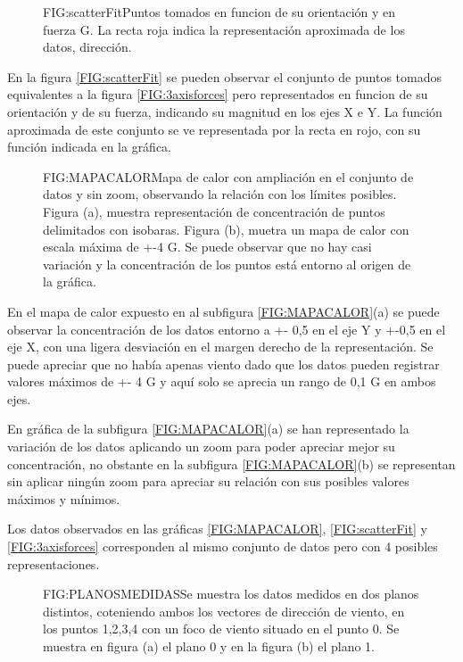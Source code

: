 \begin{figure}[Puntos de medida]{FIG:scatterFit}{Puntos tomados en funcion de su orientación y en fuerza G. La recta roja indica la representación aproximada de los datos, dirección.}
\end{figure}
En la figura \ref{FIG:scatterFit} se pueden observar el conjunto de puntos tomados equivalentes a la figura \ref{FIG:3axisforces} pero representados en funcion de su orientación y de su fuerza, indicando su magnitud en los ejes X e Y. La función aproximada de este conjunto se ve representada por la recta en rojo, con su función indicada en la gráfica.

\begin{figure}[Mapa de calor con y sin zoom]{FIG:MAPACALOR}{Mapa de calor con ampliación en el conjunto de datos y sin zoom, observando la relación con los límites posibles. Figura (a), muestra representación de concentración de puntos delimitados con isobaras. Figura (b), muetra un mapa de calor con escala máxima de +-4 G. Se puede observar que no hay casi variación y la concentración de los puntos está entorno al origen de la gráfica.}
\end{figure}

En el mapa de calor expuesto en al subfigura \ref{FIG:MAPACALOR}(a) se puede observar la concentración de los datos entorno a +- 0,5 en el eje Y y +-0,5 en el eje X, con una ligera desviación en el margen derecho de la representación. Se puede apreciar que no había apenas viento dado que los datos pueden registrar valores máximos de +- 4 G y aquí solo se aprecia un rango de 0,1 G en ambos ejes.

En gráfica de la subfigura \ref{FIG:MAPACALOR}(a) se han representado la variación de los datos aplicando un zoom para poder apreciar mejor su concentración, no obstante en la subfigura \ref{FIG:MAPACALOR}(b) se representan sin aplicar ningún zoom para apreciar su relación con sus posibles valores máximos y mínimos.

Los datos observados en las gráficas \ref{FIG:MAPACALOR}, \ref{FIG:scatterFit} y \ref{FIG:3axisforces} corresponden al mismo conjunto de datos pero con 4 posibles representaciones.


\begin{figure}[Toma de medidas dividida en planos]{FIG:PLANOSMEDIDAS}{Se muestra los datos medidos en dos planos distintos, coteniendo ambos los vectores de dirección de viento, en los puntos 1,2,3,4 con un foco de viento situado en el punto 0. Se muestra en figura (a) el plano 0 y en la figura (b) el plano 1.}
\end{figure}

